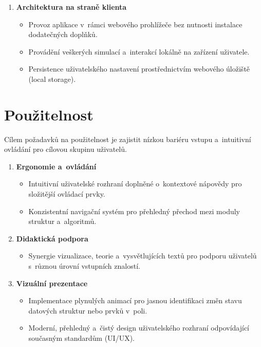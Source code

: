 \begin{enumerate}
    \item \textbf{Architektura na straně klienta}
          \begin{itemize}[nosep]
              \item Provoz aplikace v~rámci webového prohlížeče bez nutnosti instalace dodatečných doplňků.
              \item Provádění veškerých simulací a~interakcí lokálně na zařízení uživatele.
              \item Persistence uživatelského nastavení prostřednictvím webového úložiště (local storage).
          \end{itemize}
\end{enumerate}

\section{Použitelnost}
\label{sec:usability}

Cílem požadavků na použitelnost je zajistit nízkou bariéru vstupu a~intuitivní ovládání pro cílovou skupinu uživatelů.

\begin{enumerate}
    \item \textbf{Ergonomie a~ovládání}
          \begin{itemize}[nosep]
              \item Intuitivní uživatelské rozhraní doplněné o~kontextové nápovědy pro složitější ovládací prvky.
              \item Konzistentní navigační systém pro přehledný přechod mezi moduly struktur a~algoritmů.
          \end{itemize}

    \item \textbf{Didaktická podpora}
          \begin{itemize}[nosep]
              \item Synergie vizualizace, teorie a~vysvětlujících textů pro podporu uživatelů s~různou úrovní vstupních znalostí.
          \end{itemize}

    \item \textbf{Vizuální prezentace}
          \begin{itemize}[nosep]
              \item Implementace plynulých animací pro jasnou identifikaci změn stavu datových struktur nebo prvků v~poli.
              \item Moderní, přehledný a~čistý design uživatelského rozhraní odpovídající současným standardům (UI/UX).
          \end{itemize}
\end{enumerate}

